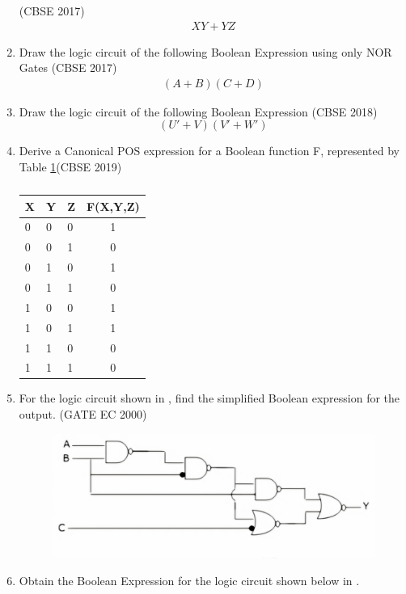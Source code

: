 \begin{enumerate}[label=\arabic*.,ref=\theenumi]
\hfill (CBSE 2017)
\label{prob:2017-1/c/6/b}
		\begin{align*}
 XY + YZ
		\end{align*}
\item Draw the logic circuit of the following Boolean Expression using only NOR Gates  
\hfill (CBSE 2017)
\label{prob:2017/c/6/b}
      \begin{align*}
      (A+B)(C+D)
      \end{align*}
\item Draw the logic circuit of the following Boolean Expression
\hfill (CBSE 2018)
\label{prob:2018/c/6/b}
\begin{equation*} 
(U'+V)(V'+W')
\end{equation*}
\item Derive a Canonical POS expression for a Boolean function F, represented by 
Table \ref{tab:2019/c/6/c}\hfill (CBSE 2019)
\label{prob:2019/c/6/c}
\begin{table}[H]
\centering
\begin{tabular}{|l|l|l|c|}
	\hline
	X&Y&Z&F(X,Y,Z)\\
	\hline
	0&0&0&1\\
	0&0&1&0\\
	0&1&0&1\\
	0&1&1&0\\
	1&0&0&1\\
	1&0&1&1\\
	1&1&0&0\\
	1&1&1&0\\
	\hline
\end{tabular}
\caption{}
\label{tab:2019/c/6/c}
\end{table}
\item For the logic circuit shown in , find the simplified Boolean expression for the output. 
\label{prob:2000/gate/ec/2/7}
\hfill (GATE EC 2000)
\begin{figure}[H]
    \centering
    \includegraphics[width=0.75\columnwidth]{figs/2000-gate-ec-2-7.jpg}
    \caption{}
\label{fig:2000/gate/ec/2/7}
\end{figure}
\item 
Obtain the Boolean Expression for the logic circuit shown below
in .
\label{prob:1993/gate/ec/4/8}


\end{enumerate}

